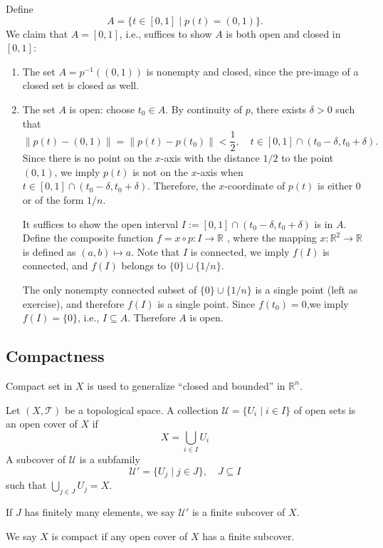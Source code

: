 \begin{example}
\begin{enumerate}
\begin{enumerate}
Define 
\[
A=\{t\in[0,1]\mid p(t)=(0,1)\}.
\]
We claim that $A=[0,1]$, i.e., suffices to show $A$ is both open and closed in $[0,1]$:
\begin{enumerate}
\item
The set $A=p^{-1}((0,1))$ is nonempty and closed, since the pre-image of a closed set is closed as well.
\item
The set $A$ is open: choose $t_0\in A$. By continuity of $p$, there exists $\delta>0$ such that 
\[\|p(t) - (0,1)\|=
\|p(t) - p(t_0)\|<\frac{1}{2},\quad
t\in[0,1]\cap(t_0-\delta,t_0+\delta).
\]
\qquad Since there is no point on the $x$-axis with the distance $1/2$ to the point $(0,1)$, we imply $p(t)$ is not on the $x$-axis when $t\in[0,1]\cap(t_0-\delta,t_0+\delta).$
Therefore, the $x$-coordinate of $p(t)$ is either $0$ or of the form $1/n$.

\qquad It suffices to show the open interval $I:=[0,1]\cap(t_0-\delta,t_0+\delta)$ is in $A$. Define the composite function $f=x\circ p: I\to\mathbb{R}$ , where the mapping $x:\mathbb{R}^2\to\mathbb{R}$ is defined as $(a,b)\mapsto a$.
Note that $I$ is connected, we imply $f(I)$ is connected, and $f(I)$ belongs to $\{0\}\cup\{1/n\}$.

\qquad The only nonempty connected subset of $\{0\}\cup\{1/n\}$ is a single point (left as exercise), and therefore $f(I)$ is a single point.
Since $f(t_0) = 0$,we imply $f(I) = \{0\}$, i.e., $I\subseteq A$. Therefore $A$ is open.
\end{enumerate}
\end{enumerate}
\end{enumerate}
\end{example}

\subsection{Compactness}
Compact set in $X$ is used to generalize ``closed and bounded'' in $\mathbb{R}^n$.
\begin{definition}
Let $(X,\mathcal{T})$ be a topological space.
A collection $\mathcal{U}=\{U_i\mid i\in I\}$ of open sets is an open cover of $X$ if 
\[
X=\bigcup_{i\in I}U_i
\]
A subcover of $\mathcal{U}$ is a subfamily
\[
\mathcal{U}'=\{U_j\mid j\in J\}, \quad J\subseteq I
\]
such that $\bigcup_{j\in J}U_j=X$.

If $J$ has finitely many elements, we say $\mathcal{U}'$ is a finite subcover of $X$.

We say $X$ is compact if any open cover of $X$ has a finite subcover.
\end{definition}


